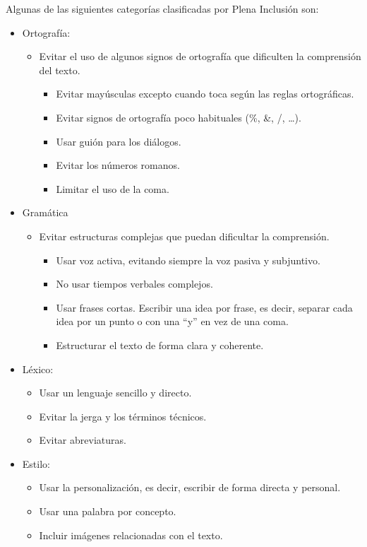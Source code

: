 Algunas de las siguientes categorías clasificadas por Plena Inclusión \citep{LFMetodos} son:
	\begin{itemize}
\item Ortografía:
\begin{itemize}
\item Evitar el uso de algunos signos de ortografía que dificulten la comprensión del texto.
	\begin{itemize}
\item	Evitar mayúsculas excepto cuando toca según las reglas ortográficas.
	
\item	Evitar signos de ortografía poco habituales (\%, \&, /, …).
\item Usar guión para los diálogos.
\item Evitar los números romanos.
	\item Limitar el uso de la coma.


 \end{itemize}
 \end{itemize}

\item Gramática
\begin{itemize}
\item Evitar estructuras complejas que puedan dificultar la comprensión.
\begin{itemize}
	\item Usar voz activa, evitando siempre la voz pasiva y subjuntivo.
		\item No usar tiempos verbales complejos.
			\item Usar frases cortas. Escribir una idea por frase, es decir, separar cada idea por un punto o con una ``y'' en vez de una coma. 
				\item Estructurar el texto de forma clara y coherente.
 \end{itemize}
 \end{itemize}

\item Léxico:
\begin{itemize}
	\item Usar un lenguaje sencillo y directo. 
		\item Evitar la jerga y los términos técnicos. 
			\item Evitar abreviaturas.    	
 \end{itemize}

\item Estilo:

\begin{itemize}
	\item Usar la personalización, es decir, escribir de forma directa y personal. 

	\item Usar una palabra por concepto.
	

	\item Incluir imágenes relacionadas con el texto.
 \end{itemize}
 \end{itemize}
